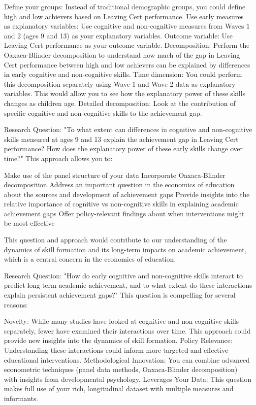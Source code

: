 \documentclass[12pt,a4paper,onecolumn]{article}
\numberwithin{equation}{section}
\begin{document}
Define your groups: Instead of traditional demographic groups, you could define high and low achievers based on Leaving Cert performance.
Use early measures as explanatory variables: Use cognitive and non-cognitive measures from Waves 1 and 2 (ages 9 and 13) as your explanatory variables.
Outcome variable: Use Leaving Cert performance as your outcome variable.
Decomposition: Perform the Oaxaca-Blinder decomposition to understand how much of the gap in Leaving Cert performance between high and low achievers can be explained by differences in early cognitive and non-cognitive skills.
Time dimension: You could perform this decomposition separately using Wave 1 and Wave 2 data as explanatory variables. This would allow you to see how the explanatory power of these skills changes as children age.
Detailed decomposition: Look at the contribution of specific cognitive and non-cognitive skills to the achievement gap.

Research Question:
"To what extent can differences in cognitive and non-cognitive skills measured at ages 9 and 13 explain the achievement gap in Leaving Cert performance? How does the explanatory power of these early skills change over time?"
This approach allows you to:

Make use of the panel structure of your data
Incorporate Oaxaca-Blinder decomposition
Address an important question in the economics of education about the sources and development of achievement gaps
Provide insights into the relative importance of cognitive vs non-cognitive skills in explaining academic achievement gaps
Offer policy-relevant findings about when interventions might be most effective

This question and approach would contribute to our understanding of the dynamics of skill formation and its long-term impacts on academic achievement, which is a central concern in the economics of education.


Research Question:
"How do early cognitive and non-cognitive skills interact to predict long-term academic achievement, and to what extent do these interactions explain persistent achievement gaps?"
This question is compelling for several reasons:

Novelty: While many studies have looked at cognitive and non-cognitive skills separately, fewer have examined their interactions over time. This approach could provide new insights into the dynamics of skill formation.
Policy Relevance: Understanding these interactions could inform more targeted and effective educational interventions.
Methodological Innovation: You can combine advanced econometric techniques (panel data methods, Oaxaca-Blinder decomposition) with insights from developmental psychology.
Leverages Your Data: This question makes full use of your rich, longitudinal dataset with multiple measures and informants.
\end{document}
